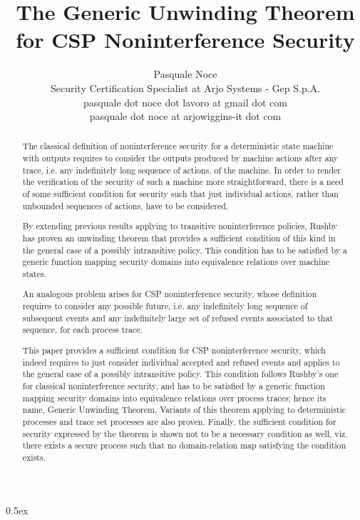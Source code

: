 \documentclass[11pt,a4paper]{article}
\begin{document}
\title{The Generic Unwinding Theorem\\for CSP Noninterference Security}
\author{Pasquale Noce\\Security Certification Specialist at Arjo Systems - Gep S.p.A.\\pasquale dot noce dot lavoro at gmail dot com\\pasquale dot noce at arjowiggins-it dot com}
\maketitle

\begin{abstract}
The classical definition of noninterference security for a deterministic state
machine with outputs requires to consider the outputs produced by machine
actions after any trace, i.e. any indefinitely long sequence of actions, of the
machine. In order to render the verification of the security of such a machine
more straightforward, there is a need of some sufficient condition for security
such that just individual actions, rather than unbounded sequences of actions,
have to be considered.

By extending previous results applying to transitive noninterference policies,
Rushby has proven an unwinding theorem that provides a sufficient condition of
this kind in the general case of a possibly intransitive policy. This condition
has to be satisfied by a generic function mapping security domains into
equivalence relations over machine states.

An analogous problem arises for CSP noninterference security, whose definition
requires to consider any possible future, i.e. any indefinitely long sequence of
subsequent events and any indefinitely large set of refused events associated to
that sequence, for each process trace.

This paper provides a sufficient condition for CSP noninterference security,
which indeed requires to just consider individual accepted and refused events
and applies to the general case of a possibly intransitive policy. This
condition follows Rushby's one for classical noninterference security, and has
to be satisfied by a generic function mapping security domains into equivalence
relations over process traces; hence its name, Generic Unwinding Theorem.
Variants of this theorem applying to deterministic processes and trace set
processes are also proven. Finally, the sufficient condition for security
expressed by the theorem is shown not to be a necessary condition as well, viz.
there exists a secure process such that no domain-relation map satisfying the
condition exists.
\end{abstract}

\tableofcontents

\parindent 0pt\parskip 0.5ex





\end{document}
